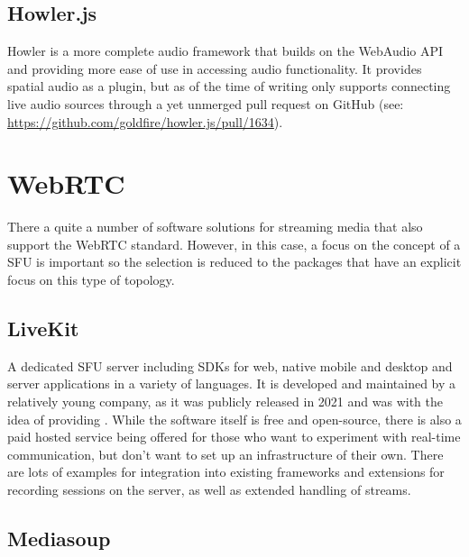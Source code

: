 \subsection{Howler.js}

Howler is a more complete audio framework that builds on the WebAudio \ac{API} and providing more ease of use in accessing audio functionality. It provides spatial audio as a plugin, but as of the time of writing only supports connecting live audio sources through a yet unmerged pull request on GitHub (see: \href{https://github.com/goldfire/howler.js/pull/1634}{https://github.com/goldfire/howler.js/pull/1634}).


\section{WebRTC}

There a quite a number of software solutions for streaming media that also support the WebRTC standard. However, in this case, a focus on the concept of a \ac{SFU} is important so the selection is reduced to the packages that have an explicit focus on this type of topology.



\subsection{LiveKit}

A dedicated \ac{SFU} server including \ac{SDK}s for web, native mobile and desktop and server applications in a variety of languages. It is developed and maintained by a relatively young company, as it was publicly released in 2021 and was  with the idea of providing  \parencite{livekitAbout}. While the software itself is free and open-source, there is also a paid hosted service being offered for those who want to experiment with real-time communication, but don't want to set up an infrastructure of their own. There are lots of examples for integration into existing frameworks and extensions for recording sessions on the server, as well as extended handling of streams.

\subsection{Mediasoup}

